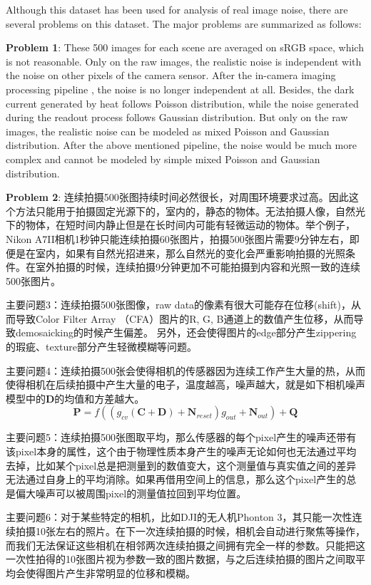\documentclass[10pt,twocolumn,letterpaper]{article}
\begin{document}
Although this dataset has been used for analysis of real image noise, there are several problems on this dataset. The major problems are summarized as follows:

\textbf{Problem 1}: These 500 images for each scene are averaged on sRGB space, which is not reasonable. Only on the raw images, the realistic noise is independent with the noise on other pixels of the camera sensor. After the in-camera imaging processing pipeline \cite{NewInCamera,crosschannel2016,karaimer_brown_ECCV_2016}, the noise is no longer independent at all. Besides, the dark current generated by heat follows Poisson distribution, while the noise generated during the readout process follows Gaussian distribution. But only on the raw images, the realistic noise can be modeled as mixed Poisson and Gaussian distribution. After the above mentioned pipeline, the noise would be much more complex and cannot be modeled by simple mixed Poisson and Gaussian distribution.

\textbf{Problem 2}: 连续拍摄500张图持续时间必然很长，对周围环境要求过高。因此这个方法只能用于拍摄固定光源下的，室内的，静态的物体。无法拍摄人像，自然光下的物体，在短时间内静止但是在长时间内可能有轻微运动的物体。举个例子，Nikon A7II相机1秒钟只能连续拍摄60张图片，拍摄500张图片需要9分钟左右，即便是在室内，如果有自然光招进来，那么自然光的变化会严重影响拍摄的光照条件。在室外拍摄的时候，连续拍摄9分钟更加不可能拍摄到内容和光照一致的连续500张图片。

主要问题3：连续拍摄500张图像，raw data的像素有很大可能存在位移(shift)，从而导致Color Filter Array （CFA）图片的R, G, B通道上的数值产生位移，从而导致demosaicking的时候产生偏差。 另外，还会使得图片的edge部分产生zippering的瑕疵、texture部分产生轻微模糊等问题。

主要问题4：连续拍摄500张会使得相机的传感器因为连续工作产生大量的热，从而使得相机在后续拍摄中产生大量的电子，温度越高，噪声越大，就是如下相机噪声模型中的$\bm{D}$的均值和方差越大。
\begin{equation}
\bm{P} = f((g_{cv}(\bm{C}+\bm{D})+\bm{N}_{reset})g_{out}+\bm{N}_{out})+\bm{Q}
\end{equation}

主要问题5：连续拍摄500张图取平均，那么传感器的每个pixel产生的噪声还带有该pixel本身的属性，这个由于物理性质本身产生的噪声无论如何也无法通过平均去掉，比如某个pixel总是把测量到的数值变大，这个测量值与真实值之间的差异无法通过自身上的平均消除。如果再借用空间上的信息，那么这个pixel产生的总是偏大噪声可以被周围pixel的测量值拉回到平均位置。


主要问题6：对于某些特定的相机，比如DJI的无人机Phonton 3，其只能一次性连续拍摄10张左右的照片。在下一次连续拍摄的时候，相机会自动进行聚焦等操作，而我们无法保证这些相机在相邻两次连续拍摄之间拥有完全一样的参数。只能把这一次性拍得的10张图片视为参数一致的图片数据，与之后连续拍摄的图片之间取平均会使得图片产生非常明显的位移和模糊。
\end{document}
